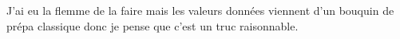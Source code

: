 \begin{solution}
\begin{questions}
    \question J'ai eu la flemme de la faire mais les valeurs données viennent d'un bouquin de prépa classique donc je pense que c'est un truc raisonnable.
\end{questions}

\end{solution}